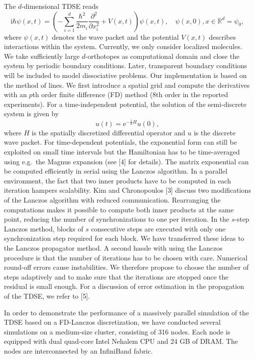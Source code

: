 \documentclass{report}
\begin{document}
The $d$-dimensional TDSE reads
\begin{equation*}
\mathrm{i}\hbar \psi(x,t) = \left(-
\sum_{i=1}^d\frac{\hbar^2}{2m_i}\frac{\partial^2}{\partial x_i^2} +
V(x,t)\right)\psi(x,t), \quad \psi(x,0), x \in \mathbb{R}^d = \psi_0,
\end{equation*}
where $\psi(x,t)$ denotes the wave packet and the potential $V(x,t)$
describes interactions within the system. Currently, we only consider
localized molecules. We take sufficiently large $d$-orthotopes as
computational domain and close the system by periodic boundary
conditions. Later, transparent boundary conditions will be included to
model dissociative problems. Our implementation is based on the method of
lines. We first introduce a spatial grid and compute the derivatives with
an $p$th order finite difference (FD) method (8th order in the reported
experiments). For a time-independent potential, the solution of the
semi-discrete system is given by
\begin{equation*}
u(t) = \mathrm{e}^{-\frac{\mathrm{i}}{\hbar} H}u(0),
\end{equation*}
where $H$ is the spatially discretized differential operator and $u$ is
the discrete wave packet. For time-dependent potentials, the exponential
form can still be exploited on small time intervals but the Hamiltonian
has to be time-averaged using e.g.~the Magnus expansion (see [4] for
details). The matrix exponential can be computed efficiently in serial
using the Lanczos algorithm. In a parallel environment, the fact that two
inner products have to be computed in each iteration hampers scalability.
Kim and Chronopoulos [3] discuss two modifications of the Lanczos
algorithm with reduced communication. Rearranging the computations makes
it possible to compute both inner products at the same point, reducing
the number of synchronizations to one per iteration. In the $s$-step
Lanczos method, blocks of $s$ consecutive steps are executed with only
one synchronization step required for each block. We have transferred
these ideas to the Lanczos propagator method. A second hassle with using
the Lanczos procedure is that the number of iterations has to be chosen
with care. Numerical round-off errors cause instabilities. We therefore
propose to choose the number of steps adaptively and to make sure that
the iterations are stopped once the residual is small enough. For a
discussion of error estimation in the propagation of the TDSE, we refer
to [5].

In order to demonstrate the performance of a massively parallel
simulation of the TDSE based on a FD-Lanczos discretization, we have
conducted several simulations on a medium-size cluster, consisting of 316
nodes. Each node is equipped with dual quad-core Intel Nehalem CPU and 24
GB of DRAM. The nodes are interconnected by an InfiniBand fabric.
\end{document}

